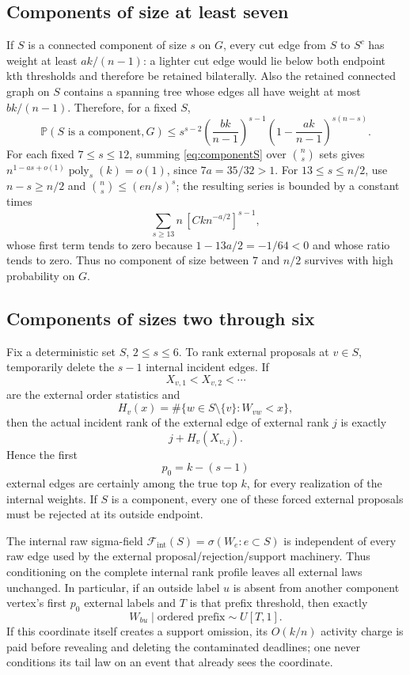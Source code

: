 \documentclass[11pt]{article}
\newcommand{\Pp}{\mathbb P}
\newcommand{\1}{\mathbf 1}
\begin{document}
\subsection{Components of size at least seven}

If $S$ is a connected component of size $s$ on $G$, every cut edge from $S$ to $S^c$
has weight at least $ak/(n-1)$: a lighter cut edge would lie below both endpoint kth
thresholds and therefore be retained bilaterally.  Also the retained connected graph on
$S$ contains a spanning tree whose edges all have weight at most $bk/(n-1)$.  Therefore,
for a fixed $S$,
\begin{equation}\label{eq:componentS}
 \Pp(S\text{ is a component},G)
 \le s^{s-2}\left(\frac{bk}{n-1}\right)^{s-1}
 \left(1-\frac{ak}{n-1}\right)^{s(n-s)}.
\end{equation}
For each fixed $7\le s\le12$, summing \eqref{eq:componentS} over $\binom ns$ sets gives
$n^{1-as+o(1)}\operatorname{poly}_s(k)=o(1)$, since $7a=35/32>1$.
For $13\le s\le n/2$, use $n-s\ge n/2$ and $\binom ns\le(en/s)^s$; the resulting
series is bounded by a constant times
\[
 \sum_{s\ge13}n\,[Ck n^{-a/2}]^{s-1},
\]
whose first term tends to zero because $1-13a/2=-1/64<0$ and whose ratio tends to zero.
Thus no component of size between $7$ and $n/2$ survives with high probability on $G$.

\subsection{Components of sizes two through six}

Fix a deterministic set $S$, $2\le s\le6$.  To rank external proposals at $v\in S$,
temporarily delete the $s-1$ internal incident edges.  If
\[
 X_{v,1}<X_{v,2}<\cdots
\]
are the external order statistics and
\[
 H_v(x)=\#\{w\in S\setminus\{v\}:W_{vw}<x\},
\]
then the actual incident rank of the external edge of external rank $j$ is exactly
\begin{equation}\label{eq:rankprofile}
 j+H_v(X_{v,j}).
\end{equation}
Hence the first
\[
 p_0=k-(s-1)
\]
external edges are certainly among the true top $k$, for every realization of the internal
weights.  If $S$ is a component, every one of these forced external proposals must be
rejected at its outside endpoint.

The internal raw sigma-field
$\mathcal F_{\mathrm{int}}(S)=\sigma(W_e:e\subset S)$ is independent of every raw edge
used by the external proposal/rejection/support machinery.  Thus conditioning on the
complete internal rank profile leaves all external laws unchanged.  In particular, if an
outside label $u$ is absent from another component vertex's first $p_0$ external labels
and $T$ is that prefix threshold, then exactly
\[
 W_{bu}\mid\text{ordered prefix}\sim U[T,1].
\]
If this coordinate itself creates a support omission, its $O(k/n)$ activity charge is paid
before revealing and deleting the contaminated deadlines; one never conditions its tail
law on an event that already sees the coordinate.
\end{document}
